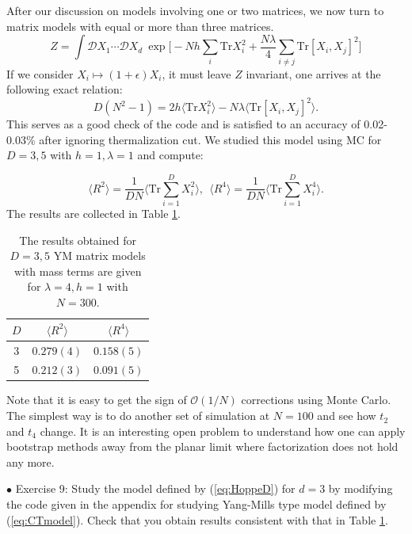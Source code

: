 \documentclass[11pt]{article}
\begin{document}
After our discussion on models involving one or two matrices, we now turn to matrix models 
with equal or more than three matrices. %
\begin{equation}
\label{eq:HoppeD} 
	Z = \int \mathcal{D}X_1 \cdots \mathcal{D}X_d ~
	\exp\Big[ -Nh\sum_{i}\mbox{Tr}X_{i}^{2} + \frac{N\lambda}{4} \sum_{i \neq j} \mbox{Tr} [X_i,X_j]^{2}\Big]
\end{equation}
If we consider $X_i \mapsto (1+\epsilon) X_i$, it must leave $Z$ invariant, one arrives at the following exact relation: 
\begin{equation}
	D(N^2 -1) = 2 h \langle \mbox{Tr}X_{i}^{2} \rangle 
	- N \lambda \langle \mbox{Tr}[X_i,X_j]^{2} \rangle. 
\end{equation}
This serves as a good check of the code and is satisfied to an accuracy of 0.02-0.03\% after ignoring thermalization cut. We studied this model using MC for $D=3,5$ with $h=1, \lambda=1$ and compute: 

\begin{equation}
\label{eq:R2R4} 
	\langle R^2 \rangle =   \frac{1}{DN} \Bigg \langle \mbox{Tr} \sum_{i=1}^{D} X_{i}^2 \bigg \rangle, 
	~~ \langle R^4 \rangle =   \frac{1}{DN} \Bigg \langle \mbox{Tr} \sum_{i=1}^{D} X_{i}^4 \bigg \rangle.  
\end{equation}
The results are collected in Table \ref{table:D_YMM_data}. 

\begin{table}[h!]
	\centering
	\begin{tabular}{||c c c||} 
		\hline
		$D$ & $ \langle R^2 \rangle$ & $ \langle R^4 \rangle$ \\ [0.5ex] 
		\hline\hline
		3 & $ 0.279(4) $ & $ 0.158(5) $  \\ 
		5 & $ 0.212(3) $ & $ 0.091(5) $
		 \\ [1ex] 
		\hline 
	\end{tabular}
\caption{The results obtained for $D = 3,5$ YM matrix models with mass terms are given for $\lambda=4, h=1$ with $N=300$.}
\label{table:D_YMM_data}
\end{table}
Note that it is easy to get the sign of $\mathcal{O}(1/N)$ corrections using Monte Carlo. 
The simplest way is to do another set of simulation at $N = 100$ and see how $t_{2}$ and 
$t_{4}$ change. It is an interesting open problem to understand how one can apply 
bootstrap methods away from the planar limit where factorization does not hold any more. 
\begin{mdframed}[backgroundcolor=blue!3] 
	\textsc{} 
	$\bullet$ Exercise 9: Study the model defined by (\ref{eq:HoppeD}) for $d=3$ by modifying the code given in the appendix for studying Yang-Mills type model defined by (\ref{eq:CTmodel}). Check that you obtain results consistent
	with that in Table \ref{table:D_YMM_data}.  
\end{mdframed}
\end{document}
